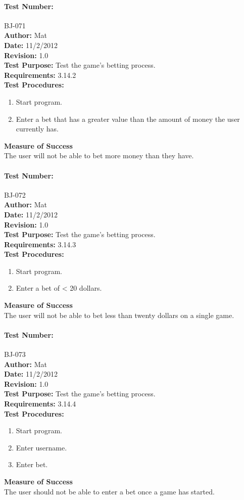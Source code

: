 \documentclass{article}
\begin{document}
\paragraph{Test Number:} BJ-071\\
\textbf{Author:} Mat\\
\textbf{Date:} 11/2/2012\\
\textbf{Revision:} 1.0\\
\textbf{Test Purpose:} Test the game's betting process.\\
\textbf{Requirements:} 3.14.2 \\
\textbf{Test Procedures:} 
\begin{enumerate}
\item Start program.
\item Enter a bet that has a greater value than the amount of money the user currently has.
\end{enumerate}
\textbf{Measure of Success}\\The user will not be able to bet more money than they have.
\paragraph{Test Number:} BJ-072\\
\textbf{Author:} Mat\\
\textbf{Date:} 11/2/2012\\
\textbf{Revision:} 1.0\\
\textbf{Test Purpose:} Test the game's betting process.\\
\textbf{Requirements:} 3.14.3 \\
\textbf{Test Procedures:} 
\begin{enumerate}
\item Start program.
\item Enter a bet of < 20 dollars.
\end{enumerate}
\textbf{Measure of Success}\\The user will not be able to bet less than twenty dollars on a single game.
\paragraph{Test Number:} BJ-073\\
\textbf{Author:} Mat\\
\textbf{Date:} 11/2/2012\\
\textbf{Revision:} 1.0\\
\textbf{Test Purpose:} Test the game's betting process.\\
\textbf{Requirements:} 3.14.4 \\
\textbf{Test Procedures:} 
\begin{enumerate}
\item Start program.
\item Enter username.
\item Enter bet.
\end{enumerate}
\textbf{Measure of Success}\\The user should not be able to enter a bet once a game has started.
\end{document}
